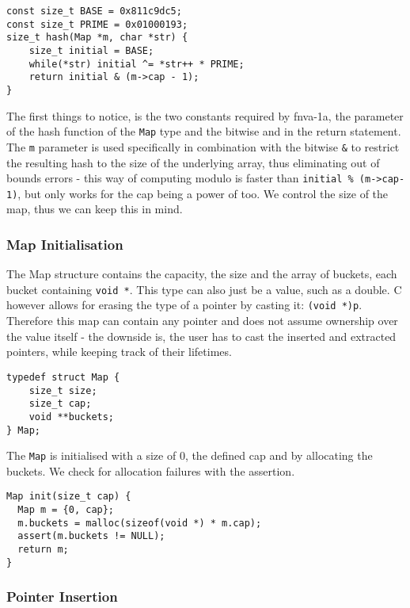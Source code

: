     \begin{verbatim}
const size_t BASE = 0x811c9dc5;
const size_t PRIME = 0x01000193;
size_t hash(Map *m, char *str) {
    size_t initial = BASE;
    while(*str) initial ^= *str++ * PRIME;
    return initial & (m->cap - 1);
}
    \end{verbatim}

    The first things to notice, is the two constants required by
    fnva-1a, the parameter of the hash function of the \texttt{Map}
    type and the bitwise and in the return statement. The \texttt{m}
    parameter is used specifically in combination with the bitwise
    \texttt{\&} to restrict the resulting hash to the size of the
    underlying array, thus eliminating out of bounds errors - this way
    of computing modulo is faster than \texttt{initial \% (m->cap-1)},
    but only works for the cap being a power of too. We
    control the size of the map, thus we can keep this in mind.
    \subsubsection*{Map Initialisation}

    The Map structure contains the capacity, the size and the array of buckets,
    each bucket containing \texttt{void *}. This type can also just be a
    value, such as a double. C however allows for erasing the type of a pointer
    by casting it: \texttt{(void *)p}. Therefore this map can contain
    any pointer and does not assume ownership over the value itself - the
    downside is, the user has to cast the inserted and extracted pointers,
    while keeping track of their lifetimes.

    \begin{verbatim}
typedef struct Map { 
    size_t size;
    size_t cap;
    void **buckets; 
} Map;
    \end{verbatim}

    The \texttt{Map} is initialised with a size of $0$, the defined cap and by
    allocating the buckets. We check for allocation failures with the
    assertion.

    \begin{verbatim}
Map init(size_t cap) {
  Map m = {0, cap};
  m.buckets = malloc(sizeof(void *) * m.cap);
  assert(m.buckets != NULL);
  return m;
}
    \end{verbatim}
    \subsubsection*{Pointer Insertion}

